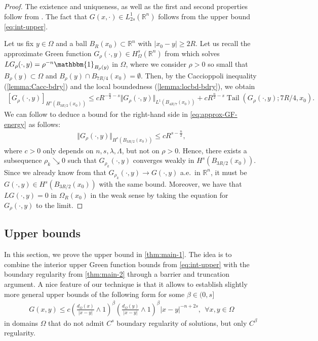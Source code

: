 \documentclass[11pt,reqno]{amsart}
\theoremstyle{plain}
\theoremstyle{definition}
\numberwithin{equation}{section}
\newcommand{\R}{\mathbb{R}}
\newcommand{\1}{\mathbbm{1}}
\DeclareMathOperator{\tail}{Tail}
\begin{document}
\begin{proof}
    The existence and uniqueness, as well as the first and second properties follow from \cite[Theorems 1.3, 1.4, 1.5, and 1.7]{KLL23}. The fact that $G(x,\cdot) \in L^1_{2s}(\R^n)$ follows from the upper bound \eqref{eq:int-upper}. 
    
    Let us fix $y \in \Omega$ and a ball $B_R(x_0) \subset \R^n$ with $|x_0-y| \geq 2R$. Let us recall the approximate Green function $G_{\rho}(\cdot,y) \in H^s_{\Omega}(\R^n)$ from \cite[Lemma 3.1]{KLL23} which solves $L G_{\rho}(\cdot,y) = \rho^{-n} \1_{B_{\rho}(y)}$ in $\Omega$, where we consider $\rho > 0$ so small that $B_{\rho}(y) \subset \Omega$ and $B_{\rho}(y) \cap B_{7R/4}(x_0) = \emptyset$. Then, by the Caccioppoli inequality (\autoref{lemma:Cacc-bdry}) and the local boundedness (\autoref{lemma:locbd-bdry}), we obtain
    \begin{align}
    \label{eq:approx-GF-energy}
        [G_{\rho}(\cdot,y)]_{H^s(B_{3R/2}(x_0))} \leq c R^{-\frac{n}{2}-s} \Vert G_{\rho}(\cdot,y) \Vert_{L^1(B_{4R/7}(x_0))} + c R^{\frac{n}{2}-s} \tail(G_{\rho}(\cdot,y);7R/4,x_0).
    \end{align}
    We can follow \cite[(4.11)-(4.16)]{KLL23} to deduce a bound for the right-hand side in \eqref{eq:approx-GF-energy} as follows:
    \begin{align*}
        \Vert G_{\rho}(\cdot,y) \Vert_{H^s(B_{3R/2}(x_0))} \le c R^{s - \frac{n}{2}},
    \end{align*}
    where $c > 0$ only depends on $n,s,\lambda,\Lambda$, but not on $\rho > 0$. Hence, there exists a subsequence $\rho_k \searrow 0$ such that $G_{\rho_k}(\cdot,y)$ converges weakly in $H^s(B_{3R/2}(x_0))$. Since we already know from \cite[Proof of Theorem 1.3]{KLL23} that $G_{\rho_k}(\cdot,y) \to G(\cdot,y)$ a.e.\ in $\R^n$, it must be $G(\cdot,y) \in H^s(B_{3R/2}(x_0))$ with the same bound. Moreover, we have that $L G(\cdot,y) = 0$ in $\Omega_{R}(x_0)$ in the weak sense by taking the equation for $G_{\rho}(\cdot,y)$ to the limit. 
\end{proof}

\subsection{Upper bounds}

In this section, we prove the upper bound in \autoref{thm:main-1}. The idea is to combine the interior upper Green function bounds from \eqref{eq:int-upper} with the boundary regularity from \autoref{thm:main-2} through a barrier and truncation argument. A nice feature of our technique is that it allows to establish slightly more general upper bounds of the following form for some $\beta \in (0,s]$
\begin{align}
\label{eq:Green-boundary}
G(x,y) \le c \left( \frac{d_{\Omega}(x)}{|x-y|} \wedge 1 \right)^{\beta}\left( \frac{d_{\Omega}(y)}{|x-y|} \wedge 1 \right)^{\beta} |x-y|^{-n+2s}, ~~ \forall x,y \in \Omega
\end{align}
in domains $\Omega$ that do not admit $C^s$ boundary regularity of solutions, but only $C^{\beta}$ regularity.
\end{document}
